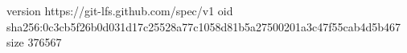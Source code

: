 version https://git-lfs.github.com/spec/v1
oid sha256:0c3cb5f26b0d031d17c25528a77c1058d81b5a27500201a3c47f55cab4d5b467
size 376567
